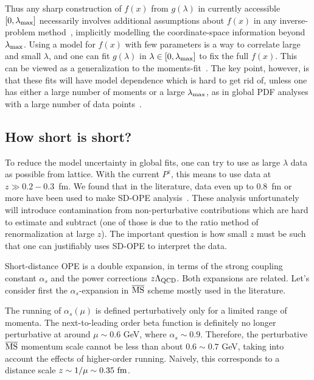 \documentclass[prd,aps,twocolumn,preprintnumbers,showpacs,nofootinbib,superscriptaddress,notitlepage]{revtex4-2}
\begin{document}
Thus any sharp construction of $f(x)$ from $g(\lambda)$ in currently accessible $[0,\lambda_{\rm max}]$ necessarily involves additional assumptions about $f(x)$ in any inverse-problem method~\cite{Karpie:2019eiq}, implicitly modelling the coordinate-space information beyond $\lambda_{\rm max}$. Using a model for $f(x)$ with few parameters is a way to
correlate large and small $\lambda$, and one can fit  $g(\lambda)$ in $\lambda \in [0,\lambda_{\rm max}]$ to 
fix the full $f(x)$. This can be viewed as a generalization to the moments-fit~\cite{Detmold:2003tm,Alexandrou:2021mmi}. The key point, however, is that these fits will have model dependence which is hard to get rid of, unless one has either a large number of moments or a large $\lambda_{\rm max}$, as in global PDF analyses with a large number of data points~\cite{Gao:2017yyd}. 

\subsection{How short is short?}

To reduce the model uncertainty in global fits, one can try to use as large $\lambda$ data as possible from lattice. With the current $P^z$, this means to use data at $z\gg 0.2-0.3$~fm. We found that in the literature, data even up to 0.8~fm or more have been used to make SD-OPE analysis~\cite{Karpie:2019eiq,Sufian:2019bol,Joo:2019jct,Joo:2019bzr,Sufian:2020vzb,Bhat:2020ktg,Gao:2020ito,DelDebbio:2020rgv,Joo:2020spy,Karpie:2021pap}. 
These analysis unfortunately will introduce contamination from non-perturbative contributions which are hard to estimate and subtract (one of those is due to the ratio method of renormalization at large $z$). The important question is how small $z$ must be such that one can justifiably uses SD-OPE to interpret the data.

Short-distance OPE is a double expansion, in terms of the strong coupling constant $\alpha_s$
and the power corrections $z\Lambda_{\rm QCD}$.
Both expansions are related. Let's consider first the $\alpha_s$-expansion in $\overline{\rm MS}$ scheme mostly used in the literature. 

The running of $\alpha_s(\mu)$ is defined
perturbatively only for a limited
range of momenta. The next-to-leading order beta function is definitely no longer perturbative at around $\mu\sim 0.6$ GeV, where $\alpha_s\sim 0.9$. Therefore, the perturbative $\overline{\rm MS}$ momentum scale cannot be less than about $0.6\sim 0.7$ GeV, taking into account the effects of higher-order running. Naively, this corresponds to a distance scale $z\sim 1/\mu\sim 0.35~{\rm fm}$.
\end{document}
